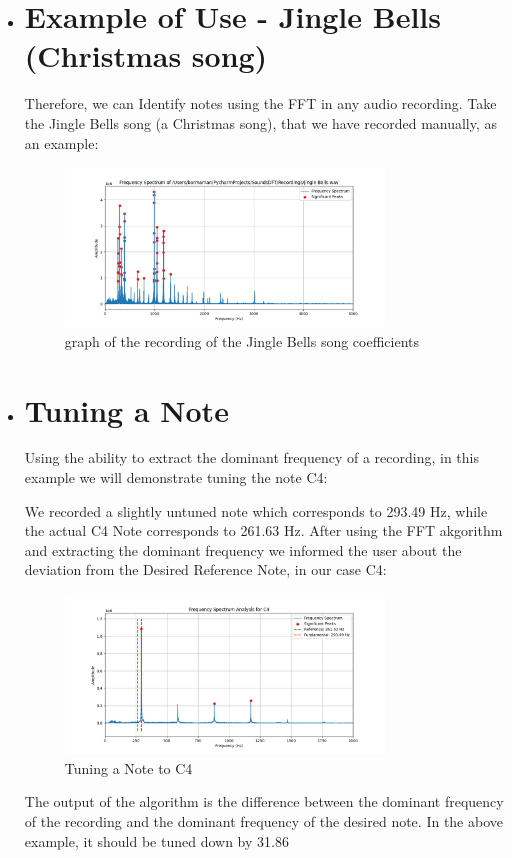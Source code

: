 \documentclass{article}
\begin{document}
\begin{itemize}
\item { \section* {Example of Use - Jingle Bells (Christmas song)}}

Therefore, we can Identify notes using the FFT in any audio recording. Take the Jingle Bells song (a Christmas song), that we have recorded manually, as an example: 

    \begin{figure}[H] 
    \centering
    \includegraphics[width=0.8\textwidth]{Jingle Bells.png}
    \caption{graph of the recording of the Jingle Bells song coefficients}
    \label{fig:hat_function}
    \end{figure}

\item{ \section* {Tuning a Note}}
Using the ability to extract the dominant frequency of a recording, in this example we will demonstrate tuning the note C4:

We recorded a slightly untuned note which corresponds to 293.49 Hz, while the actual C4 Note corresponds to 261.63 Hz. After using the FFT akgorithm and extracting the dominant frequency we informed the user about the deviation from the Desired Reference Note, in our case C4: 

 \begin{figure}[H] 
    \centering
    \includegraphics[width=0.8\textwidth]{TuneC4.png}
    \caption{Tuning a Note to C4}
    \label{fig:hat_function}
    \end{figure}

The output of the algorithm is the difference between the dominant frequency of the recording and the dominant frequency of the desired note. In the above example, it should be tuned down by 31.86

    

\end{itemize}
\end{document}
